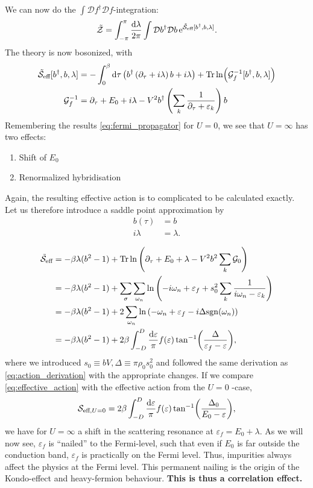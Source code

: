 We can now do the $\int\mathcal{D}f^\dagger\mathcal{D}f$-integration:
\begin{equation}
	\tilde{\mathcal{Z}} = \int_{-\pi}^\pi\frac{\dd{\lambda}}{2\pi}\int\mathcal{D}b^\dagger\mathcal{D}b\,\mathrm{e}^{\tilde{\mathcal{S}}_{\text{eff}}[b^\dagger, b, \lambda]}.
\end{equation}
The theory is now bosonized, with
\begin{align}
\tilde{\mathcal{S}}_{\text{eff}}[b^\dagger, b, \lambda] &= -\int_0^\beta \dd{\tau}\left(b^\dagger\left(\partial_\tau + i\lambda\right)b + i\lambda\right) + \Tr\ln(\mathcal{G}_f^{-1}[b^\dagger, b, \lambda]) \\
\mathcal{G}_f^{-1} &= \partial_\tau + E_0 + i\lambda-V^2b^\dagger\left(\sum_k\frac{1}{\partial_\tau + \varepsilon_k}\right)b
\end{align}
Remembering the results \eqref{eq:fermi_propagator} for $U=0$, we see that $U=\infty$ has two effects:
\begin{enumerate}[i]
	\item Shift of $E_0$
	\item Renormalized hybridisation
\end{enumerate} 
Again, the resulting effective action is to complicated to be calculated exactly. Let us therefore introduce a saddle point approximation by
\begin{align*}
b(\tau)&= b\\
i\lambda &=\lambda.
\end{align*}

\begin{align}
	\tilde{\mathcal{S}}_{\text{eff}} &= -\beta\lambda(b^2-1) + \Tr\ln\left(\partial_\tau + E_0 + \lambda-V^2b^2\sum_k\mathcal{G}_0\right)\nonumber \\
	&=-\beta\lambda(b^2-1) + \sum_\sigma\sum_{\omega_n}\ln\left(-i\omega_n + \varepsilon_f + s_0^2\sum_k\frac{1}{i\omega_n-\varepsilon_k}\right)\nonumber \\
	&= -\beta\lambda(b^2-1) + 2\sum_{\omega_n}\ln\left(-\omega_n + \varepsilon_f -i\Delta\mathrm{sgn}(\omega_n)\right)\nonumber \\
	\label{eq:effective_action}
	&= -\beta\lambda(b^2-1) + 2\beta\int_{-D}^D \frac{\dd{\varepsilon}}{\pi}f(\varepsilon)\tan[-1](\frac{\Delta}{\varepsilon_f - \varepsilon}),
\end{align}
where we introduced $s_0 \equiv bV, \Delta \equiv \pi\rho_0s_0^2$ and followed the same derivation as \eqref{eq:action_derivation} with the appropriate changes.
If we compare \eqref{eq:effective_action} with the effective action from the $U = 0$ -case,
\begin{equation}
	\mathcal{S}_{\text{eff}, U=0}  = 2\beta\int_{-D}^D\frac{\dd{\varepsilon}}{\pi}f(\varepsilon)\tan[-1](\frac{\Delta_0}{E_0 - \varepsilon}),
\end{equation}
we have for $U=\infty$ a shift in the scattering resonance at $\varepsilon_f = E_0 + \lambda$. As we will now see, $\varepsilon_f$ is ``nailed'' to the Fermi-level, such that even if $E_0$ is far outside the conduction band, $\varepsilon_f$ is practically on the Fermi level. Thus, impurities always affect the physics at the Fermi level. This permanent nailing is the origin of the Kondo-effect and heavy-fermion behaviour. \textbf{This is thus a correlation effect.}